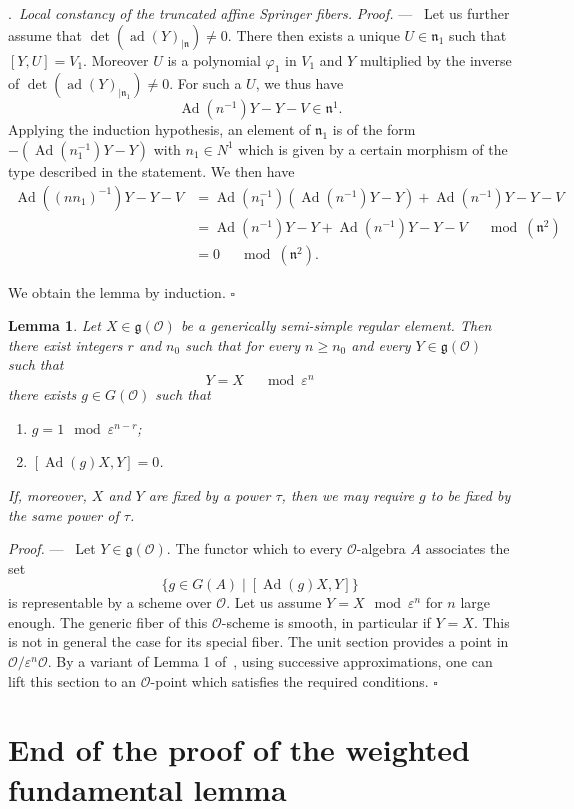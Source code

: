 \documentclass[12pt,a4paper,oneside,english,leqno]{smfart}
\makeatletter
\numberwithin{equation}{subsection}
\newcounter{theo}
\numberwithin{theo}{subsection}
\newenvironment{paragr}[1][]{\medskip\refstepcounter{subsection}%
  \par\noindent\hspace*{\parindent}\thesubsection.\ \emph{#1}%
  \@ifundefined{@empty}{}{}\ignorespaces}{\medskip}
\theoremstyle{plain}
\newtheorem{lemma}[theo]{Lemma}
\theoremstyle{definition}
\theoremstyle{remark}
\newenvironment{preuve}[1][]{\medskip\noindent\textit{Proof.} #1 ---\ }%
  {\hfill\ensuremath{\square}\medskip}
\DeclareMathOperator{\Ad}{Ad}
\DeclareMathOperator{\ad}{ad}
\newcommand{\oc}{\mathcal{O}}
\newcommand{\ggo}{\mathfrak{g}}
\newcommand{\ngo}{\mathfrak{n}}
\newcommand{\eps}{\varepsilon}
\renewcommand{\geq}{\geqslant}
\makeatother
\begin{document}
\begin{paragr}[Local constancy of the truncated affine Springer fibers.]
\begin{preuve}
Let us further assume that $\det(\ad(Y)_{|\ngo})\neq 0$. There then exists a unique $U\in\ngo_1$ such that $[Y,U]=V_1$. Moreover $U$ is a polynomial $\varphi_1$ in $V_1$ and $Y$ multiplied by the inverse of $\det(\ad(Y)_{|\ngo_1})\neq 0$. For such a $U$, we thus have
$$
\Ad(n^{-1})Y-Y-V\in\ngo^1.
$$
Applying the induction hypothesis, an element of $\ngo_1$ is of the form $-(\Ad(n_1^{-1})Y-Y)$ with $n_1\in N^1$ which is given by a certain morphism of the type described in the statement. We then have
\begin{align*}
\Ad((nn_1)^{-1})Y-Y-V&=\Ad(n_1^{-1})(\Ad(n^{-1})Y-Y)+\Ad(n^{-1})Y-Y-V\\
&=\Ad(n^{-1})Y-Y+\Ad(n^{-1})Y-Y-V\quad\mod(\ngo^2)\\
&=0\quad\mod(\ngo^2).
\end{align*}

We obtain the lemma by induction.
\end{preuve}

\begin{lemma}\label{thm:18.7.3}
Let $X\in\ggo(\oc)$ be a generically semi-simple regular element. Then there exist integers $r$ and $n_0$ such that for every $n\geq n_0$ and every $Y\in\ggo(\oc)$ such that
$$
Y=X\quad\mod\eps^n
$$
there exists $g\in G(\oc)$ such that
\begin{enumerate}
\item $g=1\mod\eps^{n-r}$; \item $[\Ad(g)X,Y]=0$.
\end{enumerate}
If, moreover, $X$ and $Y$ are fixed by a power $\tau$, then we may require $g$ to be fixed by the same power of $\tau$.
\end{lemma}

\begin{preuve}
Let $Y\in\ggo(\oc)$. The functor which to every $\oc$-algebra $A$ associates the set
$$
\{g\in G(A)\mid [\Ad(g)X,Y]\}
$$
is representable by a scheme over $\oc$. Let us assume $Y=X\mod\eps^n$ for $n$ large enough. The generic fiber of this $\oc$-scheme is smooth, in particular if $Y=X$. This is not in general the case for its special fiber. The unit section provides a point in $\oc/\eps^n\oc$. By a variant of Lemma 1 of~\cite{Elkik}, using successive approximations, one can lift this section to an $\oc$-point which satisfies the required conditions.
\end{preuve}
\end{paragr}
\section{End of the proof of the weighted fundamental lemma}\label{sec:19}
\end{document}
